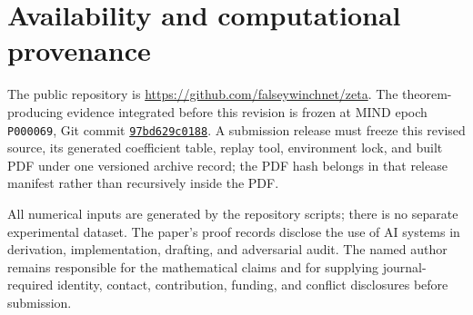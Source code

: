 \section{Availability and computational provenance}

The public repository is
\url{https://github.com/falseywinchnet/zeta}. The theorem-producing evidence
integrated before this revision is frozen at MIND epoch \texttt{P000069}, Git
commit
\href{https://github.com/falseywinchnet/zeta/commit/97bd629c0188f0add5f36ecea0b50c737a82958c}{\texttt{97bd629c0188}}.
A submission release must
freeze this revised source, its generated coefficient table, replay tool,
environment lock, and built PDF under one versioned archive record; the PDF
hash belongs in that release manifest rather than recursively inside the PDF.

All numerical inputs are generated by the repository scripts; there is no
separate experimental dataset. The paper's proof records disclose the use of
AI systems in derivation, implementation, drafting, and adversarial audit.
The named author remains responsible for the mathematical claims and for
supplying journal-required identity, contact, contribution, funding, and
conflict disclosures before submission.
